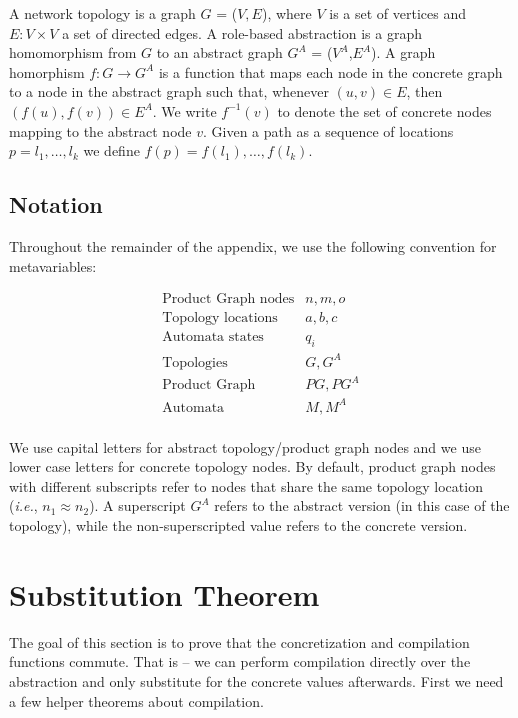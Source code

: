 \documentclass[twocolumn]{sig-alternate-10pt}
\newcommand{\IE}{\emph{i.e.}}
\begin{document}
A network topology is a graph $G$ = ($V, E$), where $V$ is a set of vertices and $E \colon V \times V$ a set of directed edges. A role-based abstraction is a graph homomorphism from $G$ to an abstract graph $G^A$ = ($V^A$,$E^A$). A graph homorphism $f : G \rightarrow G^A$ is a function that maps each node in the concrete graph to a node in the abstract graph such that, whenever $(u,v) \in E$, then $(f(u),f(v)) \in E^A$. We write $f^{-1}(v)$ to denote the set of concrete nodes mapping to the abstract node $v$. Given a path as a sequence of locations $p = l_1, \dots, l_k$ we define $f(p) = f(l_1), \dots, f(l_k)$.


\subsection{Notation}

Throughout the remainder of the appendix, we use the following convention for metavariables:

\[ \begin{array}{ll}
  \text{Product Graph nodes} & n,m,o \\
  \text{Topology locations} & a,b,c \\
  \text{Automata states} & q_i \\
  \text{Topologies} & G, G^A \\
  \text{Product Graph} & PG, PG^A \\
  \text{Automata} & M, M^A \\
\end{array} \]

We use capital letters for abstract topology/product graph nodes and we use lower case letters for concrete topology nodes. By default, product graph nodes with different subscripts refer to nodes that share the same topology location (\IE, $n_1 \approx n_2$). A superscript $G^A$ refers to the abstract version (in this case of the topology), while the non-superscripted value refers to the concrete version.


\section{Substitution Theorem}

The goal of this section is to prove that the concretization and compilation functions commute. That is -- we can perform compilation directly over the abstraction and only substitute for the concrete values afterwards. First we need a few helper theorems about compilation.
\end{document}
